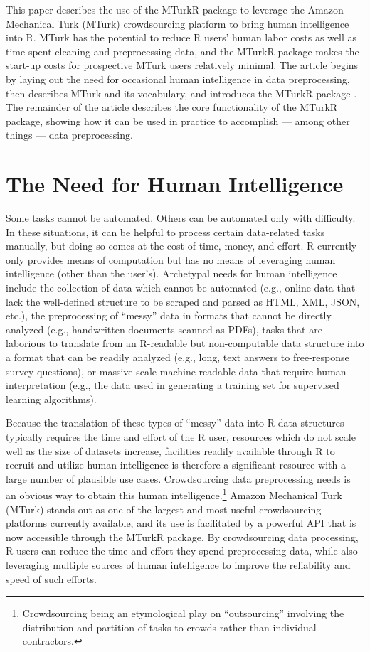 This paper describes the use of the MTurkR package to leverage the Amazon Mechanical Turk (MTurk) crowdsourcing platform to bring human intelligence into R. MTurk has the potential to reduce R users' human labor costs as well as time spent cleaning and preprocessing data, and the MTurkR package makes the start-up costs for prospective MTurk users relatively minimal. The article begins by laying out the need for occasional human intelligence in data preprocessing, then describes MTurk and its vocabulary, and introduces the MTurkR package \citep{Leeper2012c}. The remainder of the article describes the core functionality of the MTurkR package, showing how it can be used in practice to accomplish --- among other things --- data preprocessing.

\section{The Need for Human Intelligence}
Some tasks cannot be automated. Others can be automated only with difficulty. In these situations, it can be helpful to process certain data-related tasks manually, but doing so comes at the cost of time, money, and effort. R currently only provides means of computation but has no means of leveraging human intelligence (other than the user's). Archetypal needs for human intelligence include the collection of data which cannot be automated (e.g., online data that lack the well-defined structure to be scraped and parsed as HTML, XML, JSON, etc.), the preprocessing of ``messy'' data in formats that cannot be directly analyzed (e.g., handwritten documents scanned as PDFs), tasks that are laborious to translate from an R-readable but non-computable data structure into a format that can be readily analyzed (e.g., long, text answers to free-response survey questions), or massive-scale machine readable data that require human interpretation (e.g., the data used in generating a training set for supervised learning algorithms).

Because the translation of these types of ``messy'' data into R data structures typically requires the time and effort of the R user, resources which do not scale well as the size of datasets increase, facilities readily available through R to recruit and utilize human intelligence is therefore a significant resource with a large number of plausible use cases. Crowdsourcing data preprocessing needs is an obvious way to obtain this human intelligence.\footnote{Crowdsourcing being an etymological play on ``outsourcing'' involving the distribution and partition of tasks to crowds rather than individual contractors.} Amazon Mechanical Turk (MTurk) stands out as one of the largest and most useful crowdsourcing platforms currently available, and its use is facilitated by a powerful API that is now accessible through the MTurkR package. By crowdsourcing data processing, R users can reduce the time and effort they spend preprocessing data, while also leveraging multiple sources of human intelligence to improve the reliability and speed of such efforts.

